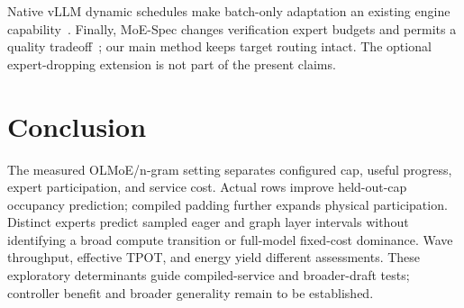 \documentclass[conference,letterpaper]{IEEEtran}
\begin{document}
Native vLLM dynamic schedules make batch-only adaptation an existing engine capability~\cite{vllmdynamic,vllmconfig}. Finally, MoE-Spec changes verification expert budgets and permits a quality tradeoff~\cite{moespec}; our main method keeps target routing intact. The optional expert-dropping extension is not part of the present claims.

\section{Conclusion}
The measured OLMoE/n-gram setting separates configured cap, useful progress, expert participation, and service cost. Actual rows improve held-out-cap occupancy prediction; compiled padding further expands physical participation. Distinct experts predict sampled eager and graph layer intervals without identifying a broad compute transition or full-model fixed-cost dominance. Wave throughput, effective TPOT, and energy yield different assessments. These exploratory determinants guide compiled-service and broader-draft tests; controller benefit and broader generality remain to be established.

\newpage


\end{document}
